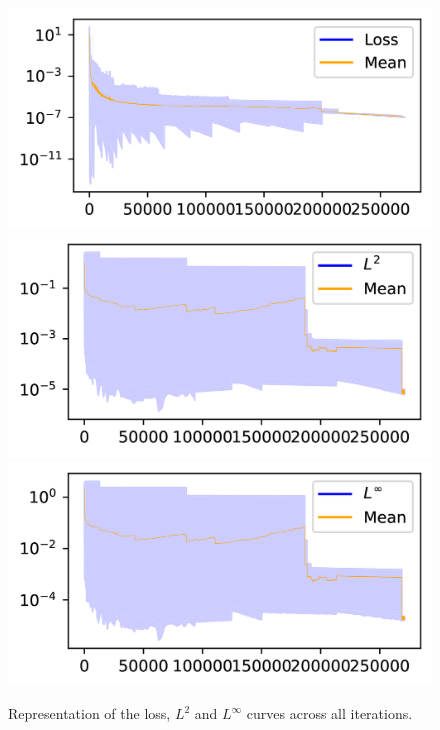 \documentclass[12pt]{report} %
\begin{document}
\begin{figure}
  \includegraphics[width=.7\textwidth]{imagenes/experiments/1d/ode/Loss_curves_semilogy_all.png}
  \includegraphics[width=.7\textwidth]{imagenes/experiments/1d/ode/L2_curves_semilogy_all.png}
  \includegraphics[width=.7\textwidth]{imagenes/experiments/1d/ode/Linf_curves_semilogy_all.png}
  \caption{Representation of the loss, $L^2$ and $L^\infty$ curves across all iterations.}
  \label{fig:ode-1d-results-all}
\end{figure}
\end{document}
